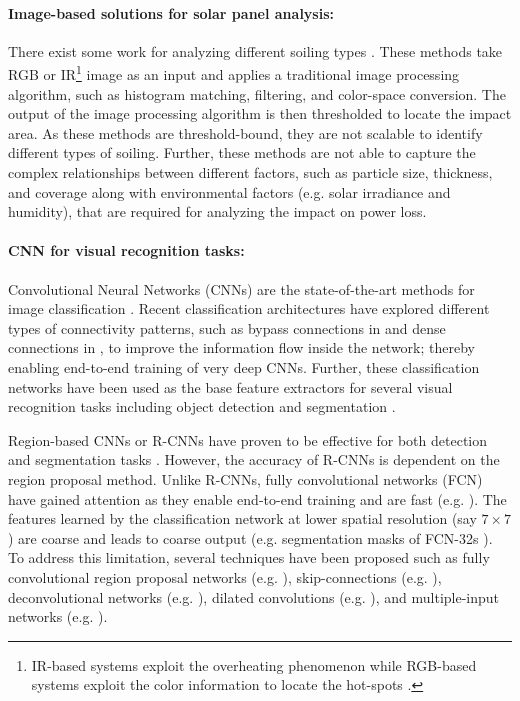 \documentclass[10pt,twocolumn,letterpaper]{article}
\begin{document}
\paragraph{Image-based solutions for solar panel analysis:} There exist some work for analyzing different soiling types \cite{aghaei2015ir, yap2015quantitative,dotenco2016automatic, Aghaei2016}. These methods take RGB or IR\footnote{IR-based systems exploit the overheating phenomenon while RGB-based systems exploit the color information to locate the hot-spots .} image as an input and applies a traditional image processing algorithm, such as histogram matching, filtering, and color-space conversion. The output of the image processing algorithm is then thresholded to locate the impact area. As these methods are threshold-bound, they are not scalable to identify different types of soiling. Further, these methods are not able to capture the complex relationships between different factors, such as particle size, thickness, and coverage along with environmental factors (e.g. solar irradiance and humidity), that are required for analyzing the impact on power loss. 

\vspace{-4mm}
\paragraph{CNN for visual recognition tasks:} Convolutional Neural Networks (CNNs) are the state-of-the-art methods for image classification \cite{simonyan2014very,szegedy2015going,ResNet,huang2017densely}. Recent classification architectures have explored different types of connectivity patterns, such as bypass connections in \cite{ResNet} and dense connections in \cite{huang2017densely}, to improve the information flow inside the network; thereby enabling end-to-end training of very deep CNNs. Further, these classification networks have been used as the base feature extractors for several visual recognition tasks including object detection \cite{ren2015faster} and segmentation \cite{chen2016deeplab}.

Region-based CNNs or R-CNNs \cite{girshick2014rich} have proven to be effective for both detection and segmentation tasks . However, the accuracy of R-CNNs is dependent on the region proposal method. Unlike R-CNNs, fully convolutional networks (FCN) have gained attention as they enable end-to-end training and are fast (e.g. \cite{ren2015faster, badrinarayanan2017segnet}). The features learned by the classification network at lower spatial resolution (say $7\times 7$) are coarse and leads to coarse output (e.g. segmentation masks of FCN-32s \cite{shelhamer2017fully}). To address this limitation, several techniques have been proposed such as fully convolutional region proposal networks (e.g. \cite{ren2015faster}), skip-connections (e.g. \cite{shelhamer2017fully, ronneberger2015u}), deconvolutional networks (e.g. \cite{badrinarayanan2017segnet}), dilated convolutions (e.g. \cite{chen2016deeplab} \cite{yu2015multi}), and multiple-input networks (e.g. \cite{lin2016refinenet}).
\end{document}
